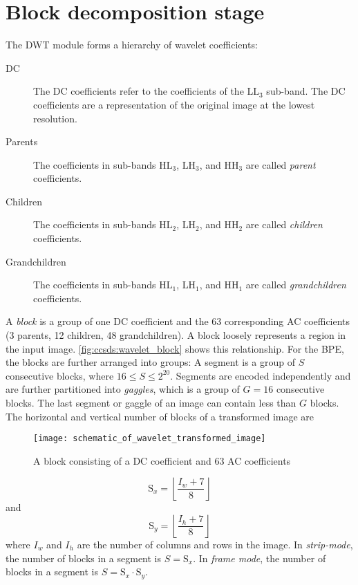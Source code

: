 \section{Block decomposition stage}\label{sec:fundamentals:ccsds_block_decomposition}
The \gls{DWT} module forms a hierarchy of wavelet coefficients:
\begin{description}
  \item[DC] The DC coefficients refer to the coefficients of the $\mathrm{LL}_3$ sub-band. The DC coefficients are a representation of the original image at the lowest resolution.
  \item[Parents] The coefficients in sub-bands $\mathrm{HL}_3$, $\mathrm{LH}_3$, and $\mathrm{HH}_3$ are called \textit{parent} coefficients.
  \item[Children] The coefficients in sub-bands $\mathrm{HL}_2$, $\mathrm{LH}_2$, and $\mathrm{HH}_2$ are called \textit{children} coefficients.
  \item[Grandchildren] The coefficients in sub-bands $\mathrm{HL}_1$, $\mathrm{LH}_1$, and $\mathrm{HH}_1$ are called \textit{grandchildren} coefficients.
\end{description}

A \textit{block} is a group of one DC coefficient and the 63 corresponding AC coefficients (3 parents, 12 children, 48 grandchildren). A block loosely represents a region in the input image. \autoref{fig:ccsds:wavelet_block} shows this relationship. For the \gls{BPE}, the blocks are further arranged into groups: A segment is a group of $S$ consecutive blocks, where $16\leq S\leq 2^{20}$. Segments are encoded independently and are further partitioned into \textit{gaggles}, which is a group of $G=16$ consecutive blocks. The last segment or gaggle of an image can contain less than $G$ blocks. The horizontal and vertical number of blocks of a transformed image are
\begin{figure}[tb]
  \centering
  \texttt{[image: schematic\_of\_wavelet\_transformed\_image]}
  \caption[A block consisting of a DC coefficient and 63 AC coefficients]{A block consisting of a DC coefficient and 63 AC coefficients \cite[p.~4-1]{CCSDS122blue}}
  \label{fig:ccsds:wavelet_block}
\end{figure}
\begin{equation}
\mathrm{S}_x=\left\lfloor\frac{I_w+7}{8}\right\rfloor
\end{equation}
and
\begin{equation}
\mathrm{S}_y=\left\lfloor\frac{I_h+7}{8}\right\rfloor
\end{equation}
where $I_w$ and $I_h$ are the number of columns and rows in the image. In \textit{strip-mode}, the number of blocks in a segment is $S=\mathrm{S}_x$. In \textit{frame mode}, the number of blocks in a segment is $S=\mathrm{S}_x\cdot\mathrm{S}_y$.
